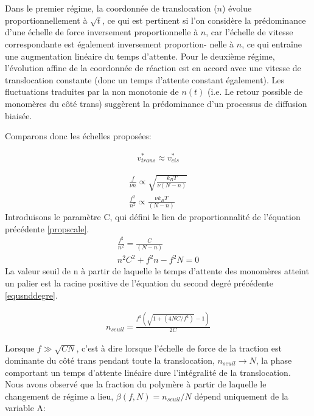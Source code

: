  Dans le premier régime, la coordonnée de translocation ($n$) évolue proportionnellement à $\sqrt{t}$, ce qui est pertinent si l'on considère la prédominance d'une échelle de force inversement proportionnelle à $n$, car l'échelle de vitesse correspondante est également inversement proportion- nelle à $n$, ce qui entraîne une augmentation linéaire du temps d'attente. Pour le deuxième régime, l'évolution affine de la coordonnée de réaction est en accord avec une vitesse de translocation constante (donc un temps d'attente constant également). Les fluctuations traduites par la non monotonie de $n(t)$ (i.e. Le retour possible de monomères du côté trans) suggèrent la prédominance d'un processus de diffusion biaisée.


Comparons donc les échelles proposées:

\begin{center}
\begin{eqnarray}
v^*_{trans}\approx v^*_{cis}
\end{eqnarray}
\end{center}

%

\begin{gather}
\frac{f}{\nu n} \propto  \sqrt{\frac{k_BT}{\nu(N-n)}} \\
\frac{f^2}{n^2} \propto \frac{\nu k_BT}{(N-n)}
\label{propscale}
\end{gather}
Introduisons le paramètre C, qui défini le lien de proportionnalité de l'équation précédente \ref{propscale}.
\begin{gather}
\frac{f^2}{n^2} = \frac{C}{(N-n)}\\
n^2C^2 +f^2n-f^2N=0
\label{equsnddegre}
\end{gather}
La valeur seuil de n à partir de laquelle le temps d'attente des monomères atteint un palier est la racine positive de l'équation du second degré précédente \ref{equsnddegre}.
\begin{center}
\begin{eqnarray}
n_{seuil}=\frac{f^2(\sqrt{1+(4NC/f^2)}-1)}{2C}
\label{nseuil}
\end{eqnarray}
\end{center}
Lorsque $f \gg \sqrt{CN}$, c'est à dire lorsque l'échelle de force de la traction est dominante du côté trans pendant toute la translocation, $n_{seuil} \rightarrow N$, la phase comportant un temps d'attente linéaire dure l'intégralité de la translocation. Nous avons observé que la fraction du polymère à partir de laquelle le changement de régime a lieu, $\beta(f,N)=n_{seuil}/N$ dépend uniquement de la variable A:

